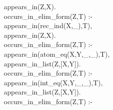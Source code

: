 \documentclass[11pt]{report}
\begin{document}
\begin{sf}
\begin{tabbing}
\hspace{6em}appears\_\hspace{0.1em}in(Z,X).\\[-0.15ex]
occurs\_\hspace{0.1em}in\_\hspace{0.1em}elim\_\hspace{0.1em}form(Z,T) :- \\[-0.15ex]
\hspace{6em}appears\_\hspace{0.1em}in(rec\_\hspace{0.1em}ind(X,\_\hspace{0.1em}),T),\\[-0.15ex]
\hspace{6em}appears\_\hspace{0.1em}in(Z,X).\\[-0.15ex]
occurs\_\hspace{0.1em}in\_\hspace{0.1em}elim\_\hspace{0.1em}form(Z,T) :- \\[-0.15ex]
\hspace{6em}appears\_\hspace{0.1em}in(atom\_\hspace{0.1em}eq(X,Y,\_\hspace{0.1em},\_\hspace{0.1em}),T),\\[-0.15ex]
\hspace{6em}appears\_\hspace{0.1em}in\_\hspace{0.1em}list(Z,[X,Y]).\\[-0.15ex]
occurs\_\hspace{0.1em}in\_\hspace{0.1em}elim\_\hspace{0.1em}form(Z,T) :- \\[-0.15ex]
\hspace{6em}appears\_\hspace{0.1em}in(int\_\hspace{0.1em}eq(X,Y,\_\hspace{0.1em},\_\hspace{0.1em}),T),\\[-0.15ex]
\hspace{6em}appears\_\hspace{0.1em}in\_\hspace{0.1em}list(Z,[X,Y]).\\[-0.15ex]
occurs\_\hspace{0.1em}in\_\hspace{0.1em}elim\_\hspace{0.1em}form(Z,T) :- \\[-0.15ex]

\end{tabbing}
\end{sf}
\end{document}
